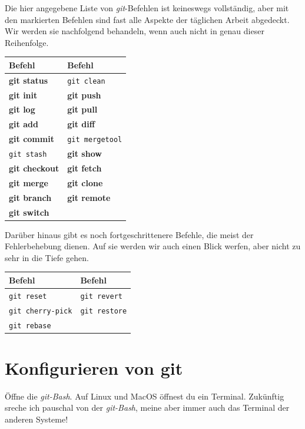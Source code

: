 \documentclass[
  ngerman,
  letterpaper,
  DIV=11]{scrreprt}
\newcommand{\markcmd}[1]{\textbf{#1}\xspace}
\newcommand{\git}{\textit{git}\xspace}
\newcommand{\gitbash}{\textit{git-Bash}\xspace}
\begin{document}
Die hier angegebene Liste von \git-Befehlen ist keineswegs vollständig,
aber mit den markierten Befehlen sind fast alle Aspekte der täglichen
Arbeit abgedeckt. Wir werden sie nachfolgend behandeln, wenn auch nicht
in genau dieser Reihenfolge.

\begin{longtable}[]{@{}ll@{}}
\toprule\noalign{}
Befehl & Befehl \\
\midrule\noalign{}
\endhead
\bottomrule\noalign{}
\endlastfoot
\markcmd{git status} & \texttt{git\ clean} \\
\markcmd{git init} & \markcmd{git push} \\
\markcmd{git log} & \markcmd{git pull} \\
\markcmd{git add} & \markcmd{git diff} \\
\markcmd{git commit} & \texttt{git\ mergetool} \\
\texttt{git\ stash} & \markcmd{git show} \\
\markcmd{git checkout} & \markcmd{git fetch} \\
\markcmd{git merge} & \markcmd{git clone} \\
\markcmd{git branch} & \markcmd{git remote} \\
\markcmd{git switch} & \\
\end{longtable}

Darüber hinaus gibt es noch fortgeschrittenere Befehle, die meist der
Fehlerbehebung dienen. Auf sie werden wir auch einen Blick werfen, aber
nicht zu sehr in die Tiefe gehen.

\begin{longtable}[]{@{}ll@{}}
\toprule\noalign{}
Befehl & Befehl \\
\midrule\noalign{}
\endhead
\bottomrule\noalign{}
\endlastfoot
\texttt{git\ reset} & \texttt{git\ revert} \\
\texttt{git\ cherry-pick} & \texttt{git\ restore} \\
\texttt{git\ rebase} & \\
\end{longtable}

\section{Konfigurieren von git}\label{konfigurieren-von-git}

Öffne die \gitbash. Auf Linux und MacOS öffnest du ein Terminal.
Zukünftig sreche ich pauschal von der \gitbash, meine aber immer auch
das Terminal der anderen Systeme!
\end{document}
